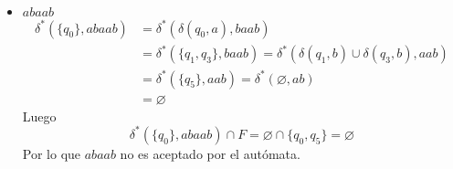 \documentclass{article}
\begin{document}
\begin{enumerate}
{\begin{itemize}
\begin{enumerate}
{\begin{itemize}
                		\item {
                			$abaab$
                			\begin{align*}
                			\delta^{*}(\{q_{0}\}, abaab)
                			&= \delta^{*}(\delta(q_{0}, a), baab) \\
                			&= \delta^{*}(\{q_{1}, q_{3}\}, baab) 
                			= \delta^{*}(\delta(q_{1}, b) 
                			\cup \delta(q_{3}, b), aab) \\
                			&= \delta^{*}(\{q_{5} \}, aab) 
                			= \delta^{*}(\varnothing, ab)\\
                			&= \varnothing            			
                			\end{align*}
                			Luego 
                			\[\delta^{*}(\{q_{0}\}, abaab) \cap F = 
                			\varnothing \cap \{q_{0}, q_{5}\} = \varnothing\]
                			Por lo que $abaab$ no es aceptado por el 
                			autómata.\\
                		}
                	\end{itemize}
                
}
\end{enumerate}
\end{itemize}}
\end{enumerate}
\end{document}
